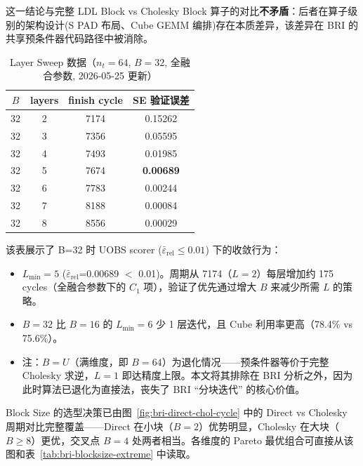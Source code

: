 \documentclass{CjC}
\begin{document}
    这一结论与完整 LDL Block vs Cholesky Block 算子的对比\textbf{不矛盾}：后者在算子级别的架构设计(S
    PAD 布局、Cube GEMM 编排)存在本质差异，该差异在 BRI
    的共享预条件器代码路径中被消除。

    \begin{table}[H]
        \centering
        \caption{Layer Sweep 数据（$n_{t}=64$, $B=32$, 全融合参数, 2026-05-25
        更新）}
        \begin{tabular}{c c c c}
            \toprule $B$ & layers & finish cycle & SE 验证误差       \\
            \midrule 32  & 2      & 7174         & 0.15262          \\
            32           & 3      & 7356         & 0.05595          \\
            32           & 4      & 7493         & 0.01985          \\
            32           & 5      & 7674         & \textbf{0.00689} \\
            32           & 6      & 7783         & 0.00244          \\
            32           & 7      & 8188         & 0.00084          \\
            32           & 8      & 8556         & 0.00029          \\
            \bottomrule
        \end{tabular}
    \end{table}

    该表展示了 B=32 时 UOBS scorer ($\bar{\varepsilon}_{\text{rel}}$$\leq0.01$) 下的收敛行为：
    \begin{itemize}
        \item $L_{\min}=5$ ($\bar{\varepsilon}_{\text{rel}}$=0.00689 $<$ 0.01)。周期从 7174（$L=2$）每层增加约
            175 cycles（全融合参数下的 $C_{1}$ 项），验证了优先通过增大 $B$
            来减少所需 $L$ 的策略。

        \item $B=32$ 比 $B=16$ 的 $L_{\min}=6$ 少 1 层迭代，且 Cube 利用率更高（78.4\%
            vs 75.6\%）。

        \item 注：$B=U$（满维度，即 $B=64$）为退化情况——预条件器等价于完整
            Cholesky 求逆，$L=1$ 即达精度上限。本文将其排除在 BRI 分析之外，因为此时算法已退化为直接法，丧失了
            BRI ``分块迭代'' 的核心价值。
    \end{itemize}

    Block Size 的选型决策已由图~\ref{fig:bri-direct-chol-cycle} 中的 Direct vs
    Cholesky 周期对比完整覆盖——Direct 在小块（$B=2$）优势明显，Cholesky 在大块（$B
    \ge8$）更优，交叉点 $B=4$ 处两者相当。各维度的 Pareto
    最优组合可直接从该图和表~\ref{tab:bri-blocksize-extreme} 中读取。
\end{document}
